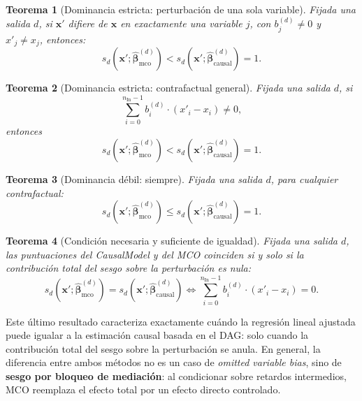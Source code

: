 \documentclass[12pt]{report} %
\newtheorem{theorem}{Teorema}
\begin{document}
\begin{theorem}[Dominancia estricta: perturbación de una sola variable]
    \label{thm:single_feature}
    Fijada una salida $d$, si $\mathbf{x}'$ difiere de $\mathbf{x}$ en exactamente una variable $j$, con $b_j^{(d)} \neq 0$ y $x'_j \neq x_j$, entonces:
    $$s_d\!\left(\mathbf{x}'; \widehat{\boldsymbol{\beta}}^{(d)}_{\text{mco}}\right) < s_d\!\left(\mathbf{x}'; \widehat{\boldsymbol{\beta}}^{(d)}_{\text{causal}}\right) = 1.$$
\end{theorem}

\begin{theorem}[Dominancia estricta: contrafactual general]
    \label{thm:general_dominance}
    Fijada una salida $d$, si
    $$\sum_{i=0}^{n_{\text{In}}-1} b_i^{(d)} \cdot (x'_i - x_i) \neq 0,$$
    entonces
    $$s_d\!\left(\mathbf{x}'; \widehat{\boldsymbol{\beta}}^{(d)}_{\text{mco}}\right) < s_d\!\left(\mathbf{x}'; \widehat{\boldsymbol{\beta}}^{(d)}_{\text{causal}}\right) = 1.$$
\end{theorem}

\begin{theorem}[Dominancia débil: siempre]
    Fijada una salida $d$, para cualquier contrafactual:
    $$s_d\!\left(\mathbf{x}'; \widehat{\boldsymbol{\beta}}^{(d)}_{\text{mco}}\right) \leq s_d\!\left(\mathbf{x}'; \widehat{\boldsymbol{\beta}}^{(d)}_{\text{causal}}\right) = 1.$$
\end{theorem}

\begin{theorem}[Condición necesaria y suficiente de igualdad]
    \label{thm:equality_iff}
    Fijada una salida $d$, las puntuaciones del CausalModel y del MCO coinciden si y solo si la contribución total del sesgo sobre la perturbación es nula:
    $$s_d\!\left(\mathbf{x}'; \widehat{\boldsymbol{\beta}}^{(d)}_{\text{mco}}\right) = s_d\!\left(\mathbf{x}'; \widehat{\boldsymbol{\beta}}^{(d)}_{\text{causal}}\right)
        \iff
        \sum_{i=0}^{n_{\text{In}}-1} b_i^{(d)} \cdot (x'_i - x_i) = 0.$$
\end{theorem}

Este último resultado caracteriza exactamente cuándo la regresión lineal ajustada puede igualar a la estimación causal basada en el DAG: solo cuando la contribución total del sesgo sobre la perturbación se anula. En general, la diferencia entre ambos métodos no es un caso de \emph{omitted variable bias}, sino de \textbf{sesgo por bloqueo de mediación}: al condicionar sobre retardos intermedios, MCO reemplaza el efecto total por un efecto directo controlado.
\end{document}
